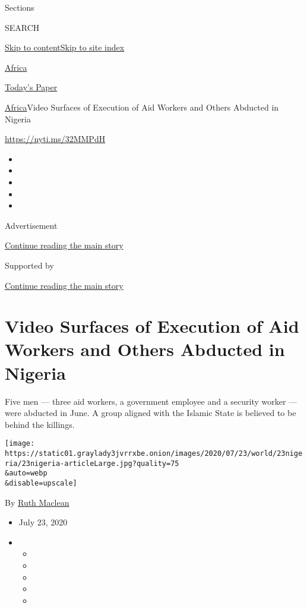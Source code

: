 Sections

SEARCH

\protect\hyperlink{site-content}{Skip to
content}\protect\hyperlink{site-index}{Skip to site index}

\href{https://www.nytimes3xbfgragh.onion/section/world/africa}{Africa}

\href{https://myaccount.nytimes3xbfgragh.onion/auth/login?response_type=cookie\&client_id=vi}{}

\href{https://www.nytimes3xbfgragh.onion/section/todayspaper}{Today's
Paper}

\href{/section/world/africa}{Africa}\textbar{}Video Surfaces of
Execution of Aid Workers and Others Abducted in Nigeria

\url{https://nyti.ms/32MMPdH}

\begin{itemize}
\item
\item
\item
\item
\item
\end{itemize}

Advertisement

\protect\hyperlink{after-top}{Continue reading the main story}

Supported by

\protect\hyperlink{after-sponsor}{Continue reading the main story}

\hypertarget{video-surfaces-of-execution-of-aid-workers-and-others-abducted-in-nigeria}{%
\section{Video Surfaces of Execution of Aid Workers and Others Abducted
in
Nigeria}\label{video-surfaces-of-execution-of-aid-workers-and-others-abducted-in-nigeria}}

Five men --- three aid workers, a government employee and a security
worker --- were abducted in June. A group aligned with the Islamic State
is believed to be behind the killings.

\texttt{[image: https://static01.graylady3jvrrxbe.onion/images/2020/07/23/world/23nigeria/23nigeria-articleLarge.jpg?quality=75\\\&auto=webp\\\&disable=upscale]}

By \href{https://www.nytimes3xbfgragh.onion/by/ruth-maclean}{Ruth
Maclean}

\begin{itemize}
\item
  July 23, 2020
\item
  \begin{itemize}
  \item
  \item
  \item
  \item
  \item
  \end{itemize}
\end{itemize}

